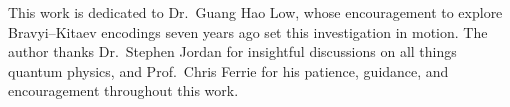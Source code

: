 \documentclass[aps,pra,preprint,superscriptaddress,showpacs]{revtex4-2}
\theoremstyle{definition}
\theoremstyle{remark}
\begin{document}
\begin{acknowledgments}
This work is dedicated to Dr.\ Guang Hao Low, whose encouragement to
explore Bravyi--Kitaev encodings seven years ago set this investigation
in motion.  The author thanks Dr.\ Stephen Jordan for insightful
discussions on all things quantum physics, and Prof.\ Chris Ferrie for
his patience, guidance, and encouragement throughout this work.
\end{acknowledgments}


\end{document}
